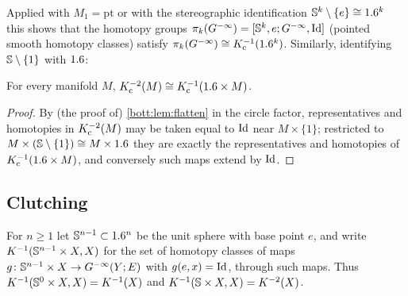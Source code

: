 Applied with $M_1=\mathrm{pt}$ or with the stereographic identification
$\mathbb{S}^k\setminus\{e\}\cong1.6^k$ this shows that the homotopy groups
$\pi_k(G^{-\infty})=[\mathbb{S}^k,e;G^{-\infty},\operatorname{Id}]$ (pointed smooth homotopy classes) satisfy
$\pi_k(G^{-\infty})\cong K_{\mathrm{c}}^{-1}(1.6^k)$. Similarly, identifying $\mathbb{S}\setminus\{1\}$ with $1.6$:

\begin{lemma}\label{bott:lem:suspension}
  For every manifold $M$, $K_{\mathrm{c}}^{-2}(M)\cong K_{\mathrm{c}}^{-1}(1.6\times M)$.
\end{lemma}
\begin{proof}
  By (the proof of) \cref{bott:lem:flatten} in the circle factor, representatives and
  homotopies in $K_{\mathrm{c}}^{-2}(M)$ may be taken equal to $\operatorname{Id}$ near $M\times\{1\}$; restricted to
  $M\times(\mathbb{S}\setminus\{1\})\cong M\times1.6$ they are exactly the representatives and
  homotopies of $K_{\mathrm{c}}^{-1}(1.6\times M)$, and conversely such maps extend by $\operatorname{Id}$.
\end{proof}

\subsection{Clutching}
For $n\ge1$ let $\mathbb{S}^{n-1}\subset1.6^n$ be the unit sphere with base point $e$, and write
$K^{-1}(\mathbb{S}^{n-1}\times X,X)$ for the set of homotopy classes of maps
$g\colon\mathbb{S}^{n-1}\times X\to G^{-\infty}(Y;E)$ with $g(e,x)=\operatorname{Id}$, through such maps. Thus
$K^{-1}(\mathbb{S}^0\times X,X)=K^{-1}(X)$ and $K^{-1}(\mathbb{S}\times X,X)=K^{-2}(X)$.

